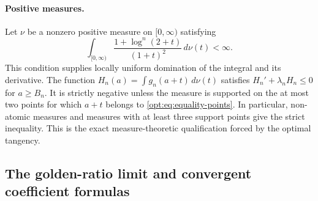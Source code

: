 \documentclass[11pt,a4paper]{article}
\theoremstyle{definition}
\theoremstyle{remark}
\numberwithin{equation}{section}
\begin{document}
\paragraph{Positive measures.}
Let $\nu$ be a nonzero positive measure on $[0,\infty)$ satisfying
\[
 \int_{[0,\infty)}\frac{1+\log^n(2+t)}{(1+t)^2}\,d\nu(t)<\infty.
\]
This condition supplies locally uniform domination of the integral
and its derivative. The function
$H_n(a)=\int g_n(a+t)\,d\nu(t)$ satisfies
$H_n'+\lambda_nH_n\leq0$ for $a\geq B_n$. It is strictly negative
unless the measure is supported on the at most two points for which
$a+t$ belongs to \eqref{opt:eq:equality-points}. In particular,
non-atomic measures and measures with at least three support points
give the strict inequality. This is the exact measure-theoretic
qualification forced by the optimal tangency.

\subsection{The golden-ratio limit and convergent coefficient formulas}
\label{opt:sec:asymptotic}
\end{document}
